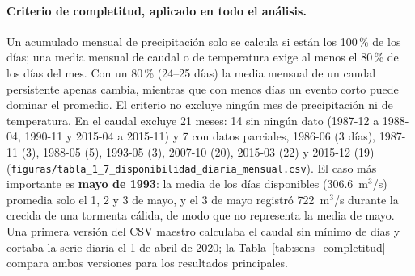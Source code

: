 \documentclass[11pt,a4paper]{article}
\newcommand{\archivo}[1]{\nolinkurl{#1}}
\begin{document}
\paragraph{Criterio de completitud, aplicado en todo el análisis.} Un acumulado mensual de precipitación solo se calcula si están los 100\,\% de los días; una media mensual de caudal o de temperatura exige al menos el 80\,\% de los días del mes. Con un 80\,\% (24--25 días) la media mensual de un caudal persistente apenas cambia, mientras que con menos días un evento corto puede dominar el promedio. El criterio no excluye ningún mes de precipitación ni de temperatura. En el caudal excluye 21 meses: 14 sin ningún dato (1987-12 a 1988-04, 1990-11 y 2015-04 a 2015-11) y 7 con datos parciales, 1986-06 (3 días), 1987-11 (3), 1988-05 (5), 1993-05 (3), 2007-10 (20), 2015-03 (22) y 2015-12 (19) (\archivo{figuras/tabla_1_7_disponibilidad_diaria_mensual.csv}). El caso más importante es \textbf{mayo de 1993}: la media de los días disponibles (306.6~m$^3$/s) promedia solo el 1, 2 y 3 de mayo, y el 3 de mayo registró 722~m$^3$/s durante la crecida de una tormenta cálida, de modo que no representa la media de mayo. Una primera versión del CSV maestro calculaba el caudal sin mínimo de días y cortaba la serie diaria el 1 de abril de 2020; la Tabla~\ref{tab:sens_completitud} compara ambas versiones para los resultados principales.

\begin{table}[H]
\centering\small
\caption{Efecto del criterio de completitud sobre los resultados del caudal (\archivo{figuras/tabla_1_9_sensibilidad_completitud_Q.csv}). Tendencias sobre anomalías mensuales con la referencia 2000-06/2020-03 y las mismas funciones de \archivo{scripts/rol_c_comun.py}.}
\label{tab:sens_completitud}
\end{table}
\end{document}
